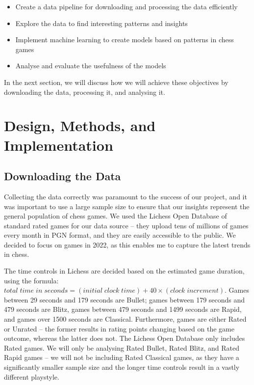 \documentclass[a4paper, 11pt]{article}
\begin{document}
\begin{itemize}
    \setlength\itemsep{0em}
    \item Create a data pipeline for downloading and processing the data efficiently
    \item Explore the data to find interesting patterns and insights
    \item Implement machine learning to create models based on patterns in chess games
    \item Analyse and evaluate the usefulness of the models
\end{itemize}

In the next section, we will discuss how we will achieve these objectives by downloading the data, processing it, and analysing it.

\section{Design, Methods, and Implementation}

\subsection{Downloading the Data}
Collecting the data correctly was paramount to the success of our project, and it was important to use a large sample size to ensure that our insights represent the general population of chess games. We used the Lichess Open Database \cite{lichessOpenDatabase} of standard rated games for our data source -- they upload tens of millions of games every month in PGN format, and they are easily accessible to the public. We decided to focus on games in 2022, as this enables me to capture the latest trends in chess.

The time controls in Lichess are decided based on the estimated game duration, using the formula: $total \; time \; in \; seconds = (initial \; clock \; time) + 40 \times (clock \; increment)$. Games between 29 seconds and 179 seconds are Bullet; games between 179 seconds and 479 seconds are Blitz, games between 479 seconds and 1499 seconds are Rapid, and games over 1500 seconds are Classical. Furthermore, games are either Rated or Unrated -- the former results in rating points changing based on the game outcome, whereas the latter does not. The Lichess Open Database only includes Rated games. We will only be analysing Rated Bullet, Rated Blitz, and Rated Rapid games -- we will not be including Rated Classical games, as they have a significantly smaller sample size and the longer time controls result in a vastly different playstyle.
\end{document}

